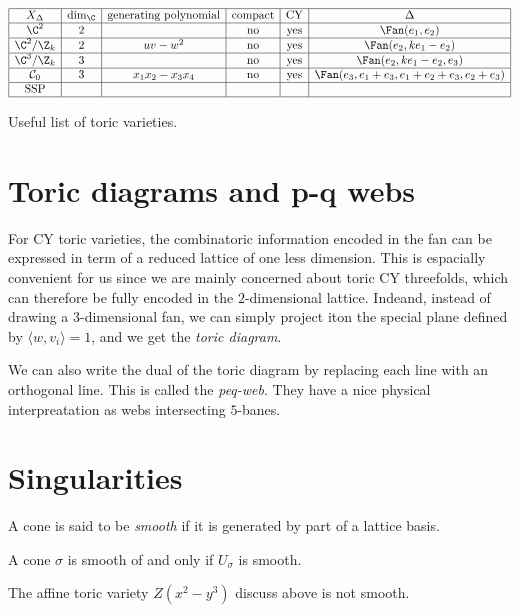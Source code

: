 \documentclass{worksheetclass}
\begin{document}
    \begin{table}[H]
        \centering
        $
        \begin{array}{|c|c|c|c|c|c|}
            \hline
            X_\Delta & \dim_\C & \text{generating polynomial} & \text{compact} & \text{CY} & \Delta \\ \hline
            \C^2 & 2 & & \text{no} & \text{yes} & \Fan(e_1,e_2) \\ \hline
            \C^2/\Z_k & 2 & uv-w^2 & \text{no} & \text{yes} & \Fan(e_2,ke_1-e_2) \\ \hline
            \C^3/\Z_k & 3 &  & \text{no} & \text{yes} & \Fan(e_2,ke_1-e_2,e_3) \\ \hline
            \mathcal{C}_0 & 3 & x_1x_2-x_3x_4 & \text{no} & \text{yes} & \Fan(e_3,e_1+e_3,e_1+e_2+e_3,e_2+e_3) \\ \hline
            \text{SSP} & & & & & \\ \hline
        \end{array}
        $
        \caption{Useful list of toric varieties.}
    \end{table}

\section{Toric diagrams and p-q webs}

    For CY toric varieties, the combinatoric information encoded in the fan can be expressed in term of a reduced lattice of one less dimension. This is espacially convenient for us since we are mainly concerned about toric CY threefolds, which can therefore be fully encoded in the $2$-dimensional lattice. Indeand, instead of drawing a $3$-dimensional fan, we can simply project iton the special plane defined by $\langle w,v_i\rangle=1$, and we get the \emph{toric diagram}.

    We can also write the dual of the toric diagram by replacing each line with an orthogonal line. This is called the \emph{peq-web}. They have a nice physical interpreatation as webs intersecting $5$-banes.

\section{Singularities}

    A cone is said to be \emph{smooth} if it is generated by part of a lattice basis.
    \begin{theorem*}
        A cone $\sigma$ is smooth of and only if $U_\sigma$ is smooth.
    \end{theorem*}
    \begin{examp*}
        The affine toric variety $Z(x^2-y^3)$ discuss above is not smooth.
    \end{examp*}
\end{document}
